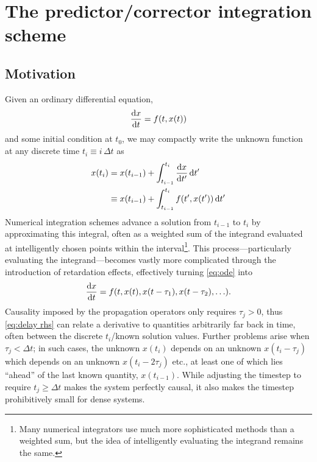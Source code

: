 \chapter{The predictor/corrector integration scheme}

\section{Motivation}

Given an ordinary differential equation,
\begin{equation}
  \dv{x}{t} = f(t, x(t))
  \label{eq:ode}
\end{equation}
and some initial condition at $t_0$, we may compactly write the unknown function at any discrete time $t_i \equiv i\,\Delta t$ as
\begin{equation}
  \begin{aligned}
    x(t_i) & = x(t_{i-1}) + \int_{t_{i-1}}^{t_i} \dv{x}{t'} \dd{t'} \\
    &                 \equiv x(t_{i-1}) + \int_{t_{i-1}}^{t_i} f(t', x(t')) \dd{t'}
    \label{eq:ode step}
  \end{aligned}
\end{equation}
Numerical integration schemes advance a solution from $t_{i-1}$ to $t_i$ by approximating this integral, often as a weighted sum of the integrand evaluated at intelligently chosen points within the interval\footnote{Many numerical integrators use much more sophisticated methods than a weighted sum, but the idea of intelligently evaluating the integrand remains the same.}.
This process---particularly evaluating the integrand---becomes vastly more complicated through the introduction of retardation effects, effectively turning \cref{eq:ode} into
\begin{equation}
  \dv{x}{t} = f(t, x(t), x(t - \tau_1), x(t - \tau_2), \ldots).
  \label{eq:delay rhs}
\end{equation}
Causality imposed by the propagation operators only requires $\tau_j > 0$, thus \cref{eq:delay rhs} can relate a derivative to quantities arbitrarily far back in time, often between the discrete $t_i$/known solution values.
Further problems arise when $\tau_j < \Delta t$; in such cases, the unknown $x(t_i)$ depends on an unknown $x(t_i - \tau_j)$ which depends on an unknown $x(t_i - 2 \tau_j)$ etc., at least one of which lies ``ahead'' of the last known quantity, $x(t_{i-1})$.
While adjusting the timestep to require $t_j \geqslant \Delta t$ makes the system perfectly causal, it also makes the timestep prohibitively small for dense systems.

